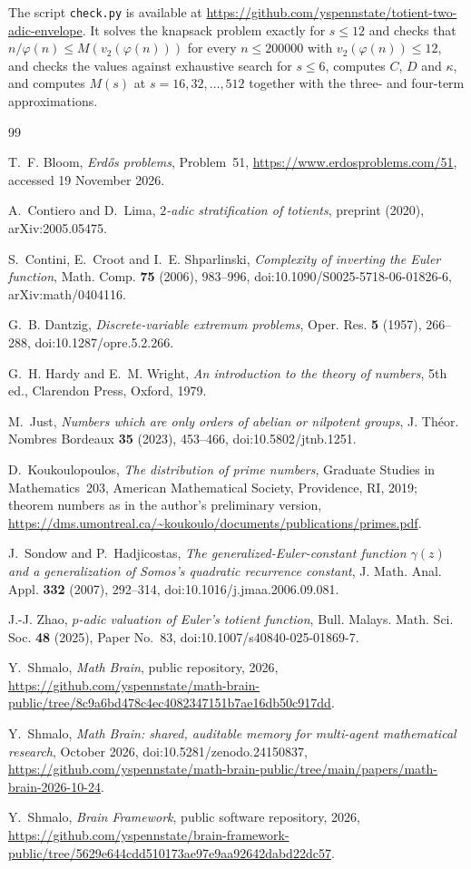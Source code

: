 \documentclass[11pt]{amsart}
\theoremstyle{remark}
\numberwithin{equation}{section}
\begin{document}
The script \texttt{check.py} is available at \url{https://github.com/yspennstate/totient-two-adic-envelope}. It solves the knapsack problem exactly for $s\le12$ and checks that $n/\varphi(n)\le M(v_2(\varphi(n)))$ for every $n\le200000$ with $v_2(\varphi(n))\le12$, and checks the values against exhaustive search for $s\le6$, computes $C$, $D$ and $\kappa$, and computes $M(s)$ at $s=16,32,\dots,512$ together with the three- and four-term approximations.

\begin{thebibliography}{99}

T.~F. Bloom, \emph{Erd\H{o}s problems}, Problem~51,
\url{https://www.erdosproblems.com/51}, accessed 19 November 2026.

A.~Contiero and D.~Lima, \emph{$2$-adic stratification of totients},
preprint (2020), arXiv:2005.05475.

S.~Contini, E.~Croot and I.~E. Shparlinski, \emph{Complexity of inverting
the Euler function}, Math. Comp. \textbf{75} (2006), 983--996,
doi:10.1090/S0025-5718-06-01826-6, arXiv:math/0404116.

G.~B. Dantzig, \emph{Discrete-variable extremum problems}, Oper.
Res. \textbf{5} (1957), 266--288, doi:10.1287/opre.5.2.266.

G.~H. Hardy and E.~M. Wright, \emph{An introduction to the theory of
numbers}, 5th ed., Clarendon Press, Oxford, 1979.

M.~Just, \emph{Numbers which are only orders of abelian or nilpotent
groups}, J. Th\'eor. Nombres Bordeaux \textbf{35} (2023), 453--466,
doi:10.5802/jtnb.1251.

D.~Koukoulopoulos, \emph{The distribution of prime numbers}, Graduate
Studies in Mathematics~203, American Mathematical Society, Providence, RI,
2019; theorem numbers as in the author's preliminary version,
\url{https://dms.umontreal.ca/~koukoulo/documents/publications/primes.pdf}.

J.~Sondow and P.~Hadjicostas, \emph{The generalized-Euler-constant
function $\gamma(z)$ and a generalization of Somos's quadratic recurrence
constant}, J. Math. Anal. Appl. \textbf{332} (2007), 292--314,
doi:10.1016/j.jmaa.2006.09.081.

J.-J. Zhao, \emph{$p$-adic valuation of Euler's totient function}, Bull.
Malays. Math. Sci. Soc. \textbf{48} (2025), Paper No.~83,
doi:10.1007/s40840-025-01869-7.

 Y.~Shmalo, \emph{Math Brain}, public repository, 2026, \url{https://github.com/yspennstate/math-brain-public/tree/8c9a6bd478c4ec4082347151b7ae16db50c917dd}.

 Y.~Shmalo, \emph{Math Brain: shared, auditable memory for multi-agent mathematical research}, October 2026, doi:10.5281/zenodo.24150837, \url{https://github.com/yspennstate/math-brain-public/tree/main/papers/math-brain-2026-10-24}.

 Y.~Shmalo, \emph{Brain Framework}, public software repository, 2026, \url{https://github.com/yspennstate/brain-framework-public/tree/5629e644cdd510173ae97e9aa92642dabd22dc57}.
\end{thebibliography}
\end{document}
